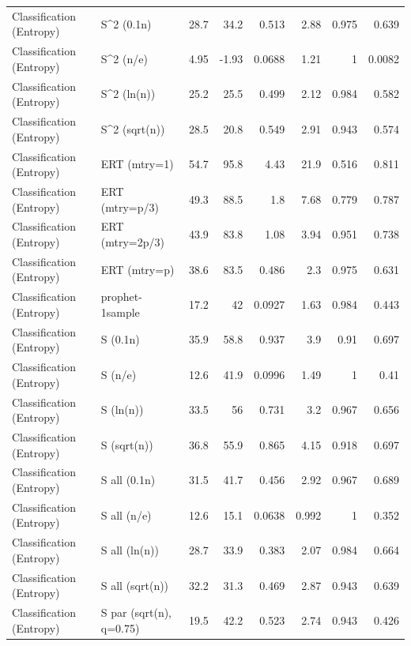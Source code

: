 \begin{table}[t]
\begin{tabular}{llrrrrrr}
Classification (Entropy) & S^2 (0.1n) & 28.7 & 34.2 & 0.513 & 2.88 & 0.975 & 0.639 \\
Classification (Entropy) & S^2 (n/e) & 4.95 & -1.93 & 0.0688 & 1.21 & 1 & 0.0082 \\
Classification (Entropy) & S^2 (ln(n)) & 25.2 & 25.5 & 0.499 & 2.12 & 0.984 & 0.582 \\
Classification (Entropy) & S^2 (sqrt(n)) & 28.5 & 20.8 & 0.549 & 2.91 & 0.943 & 0.574 \\
Classification (Entropy) & ERT (mtry=1) & 54.7 & 95.8 & 4.43 & 21.9 & 0.516 & 0.811 \\
Classification (Entropy) & ERT (mtry=p/3) & 49.3 & 88.5 & 1.8 & 7.68 & 0.779 & 0.787 \\
Classification (Entropy) & ERT (mtry=2p/3) & 43.9 & 83.8 & 1.08 & 3.94 & 0.951 & 0.738 \\
Classification (Entropy) & ERT (mtry=p) & 38.6 & 83.5 & 0.486 & 2.3 & 0.975 & 0.631 \\
Classification (Entropy) & prophet-1sample & 17.2 & 42 & 0.0927 & 1.63 & 0.984 & 0.443 \\
Classification (Entropy) & S (0.1n) & 35.9 & 58.8 & 0.937 & 3.9 & 0.91 & 0.697 \\
Classification (Entropy) & S (n/e) & 12.6 & 41.9 & 0.0996 & 1.49 & 1 & 0.41 \\
Classification (Entropy) & S (ln(n)) & 33.5 & 56 & 0.731 & 3.2 & 0.967 & 0.656 \\
Classification (Entropy) & S (sqrt(n)) & 36.8 & 55.9 & 0.865 & 4.15 & 0.918 & 0.697 \\
Classification (Entropy) & S all (0.1n) & 31.5 & 41.7 & 0.456 & 2.92 & 0.967 & 0.689 \\
Classification (Entropy) & S all (n/e) & 12.6 & 15.1 & 0.0638 & 0.992 & 1 & 0.352 \\
Classification (Entropy) & S all (ln(n)) & 28.7 & 33.9 & 0.383 & 2.07 & 0.984 & 0.664 \\
Classification (Entropy) & S all (sqrt(n)) & 32.2 & 31.3 & 0.469 & 2.87 & 0.943 & 0.639 \\
Classification (Entropy) & S par (sqrt(n), q=0.75) & 19.5 & 42.2 & 0.523 & 2.74 & 0.943 & 0.426 \\
\bottomrule
\end{tabular}
\end{table}
